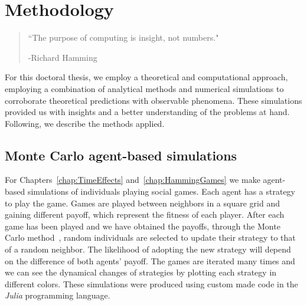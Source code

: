 \chapter{Methodology}
\label{chap:Method}


\begin{quotation}


	\vspace{-3cm}


    \begin{flushright}
    \begin{minipage}[t][5cm][b]{0.5\textwidth}
    { ``The purpose of computing is insight, not numbers."}
    
    \bigskip
    
    -{\small  Richard Hamming}
    \end{minipage}
    \end{flushright}
    
    \vspace{0.5cm}
\end{quotation}





For this doctoral thesis, we employ a theoretical and computational approach, employing a combination of analytical methods and numerical simulations to corroborate theoretical predictions with observable phenomena. These simulations provided us with insights and a better understanding of the problems at hand. Following, we describe the methods applied.


\section{Monte Carlo agent-based simulations}

For Chapters~\ref{chap:TimeEffects} and~\ref{chap:HammingGames} we make agent-based simulations of individuals playing social games. Each agent has a strategy to play the game. Games are played between neighbors in a square grid and gaining different payoff, which represent the fitness of each player. After each game has been played and we have obtained the payoffs, through the Monte Carlo method~\cite{MonteCarlo}, random individuals are selected to update their strategy to that of a random neighbor. The likelihood of adopting the new strategy will depend on the difference of both agents' payoff. The games are iterated many times and we can see the dynamical changes of strategies by plotting each strategy in different colors. These simulations were produced using custom made code in the \textit{Julia} programming language.

